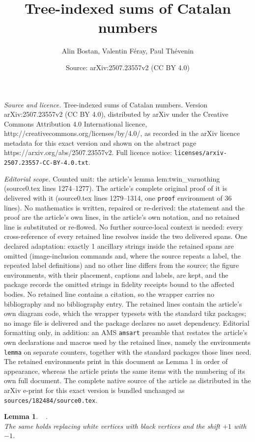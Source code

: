 \documentclass[10pt,a4paper]{amsart}
\title{Tree-indexed sums of Catalan numbers}
\author{Alin Bostan, Valentin F\'eray, Paul Th\'evenin}
\date{Source: arXiv:2507.23557v2 (CC BY 4.0)}
\newtheorem{lemma}{Lemma}
\begin{document}
\maketitle

\noindent\emph{Source and licence.} Tree-indexed sums of Catalan numbers. Version arXiv:2507.23557v2 (CC BY 4.0), distributed by arXiv under the Creative Commons Attribution 4.0 International licence, http://creativecommons.org/licenses/by/4.0/, as recorded in the arXiv licence metadata for this exact version and shown on the abstract page https://arxiv.org/abs/2507.23557v2. Full licence notice: \texttt{licenses/arxiv-2507.23557-CC-BY-4.0.txt}.\par\smallskip

\noindent\textit{Editorial scope.} Counted unit: the article's lemma lem:twin\_varnothing (source0.tex lines 1274--1277). The article's complete original proof of it is delivered with it (source0.tex lines 1279--1314, one \texttt{proof} environment of 36 lines). No mathematics is written, repaired or re-derived: the statement and the proof are the article's own lines, in the article's own notation, and no retained line is substituted or re-flowed.  No further source-local context is needed: every cross-reference of every retained line resolves inside the two delivered spans.  One declared adaptation: exactly 1 ancillary strings inside the retained spans are omitted (image-inclusion commands and, where the source repeats a label, the repeated label definitions) and no other line differs from the source; the figure environments, with their placement, captions and labels, are kept, and the package records the omitted strings in fidelity receipts bound to the affected bodies.  No retained line contains a citation, so the wrapper carries no bibliography and no bibliography entry.  The retained lines contain the article's own diagram code, which the wrapper typesets with the standard tikz packages; no image file is delivered and the package declares no asset dependency.  Editorial formatting only, in addition: an AMS \texttt{amsart} preamble that restates the article's own declarations and macros used by the retained lines, namely the environments \texttt{lemma} on separate counters, together with the standard packages those lines need.  The retained environments print in this document as Lemma 1 in order of appearance, whereas the article prints the same items with the numbering of its own full document.  The complete native source of the article as distributed in the arXiv e-print for this exact version is bundled unchanged as \texttt{sources/182484/source0.tex}.
\begin{lemma}
\label{lem:twin_varnothing}
  $\begin{array}{c}  \end{array}$.   \\
    The same holds replacing white vertices with black vertices and the shift $+1$ with $-1$.\end{lemma}
\end{document}
